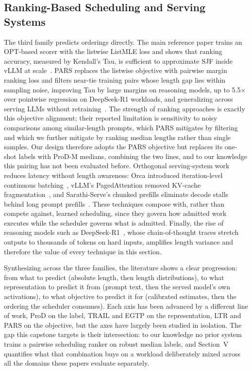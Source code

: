 \documentclass[conference]{IEEEtran}
\begin{document}
\subsection{Ranking-Based Scheduling and Serving Systems}
The third family predicts orderings directly. The main reference paper trains an OPT-based scorer with the listwise ListMLE loss and shows that ranking accuracy, measured by Kendall's Tau, is sufficient to approximate SJF inside vLLM at scale~\cite{fu2024efficient}. PARS replaces the listwise objective with pairwise margin ranking loss and filters near-tie training pairs whose length gap lies within sampling noise, improving Tau by large margins on reasoning models, up to 5.5$\times$ over pointwise regression on DeepSeek-R1 workloads, and generalizing across serving LLMs without retraining~\cite{tao2025pars}. The strength of ranking approaches is exactly this objective alignment; their reported limitation is sensitivity to noisy comparisons among similar-length prompts, which PARS mitigates by filtering and which we further mitigate by ranking median lengths rather than single samples. Our design therefore adopts the PARS objective but replaces its one-shot labels with ProD-M medians, combining the two lines, and to our knowledge this pairing has not been evaluated before. Orthogonal serving-system work reduces latency without length awareness: Orca introduced iteration-level continuous batching~\cite{yu2022orca}, vLLM's PagedAttention removed KV-cache fragmentation~\cite{kwon2023pagedattention}, and Sarathi-Serve's chunked prefills eliminate decode stalls behind long prompt prefills~\cite{agrawal2024sarathi}. These techniques compose with, rather than compete against, learned scheduling, since they govern how admitted work executes while the scheduler governs what is admitted. Finally, the rise of reasoning models such as DeepSeek-R1~\cite{guo2025deepseekr1}, whose chain-of-thought traces stretch outputs to thousands of tokens on hard inputs, amplifies length variance and therefore the value of every technique in this section.

Synthesizing across the three families, the literature shows a clear progression: from what to predict (absolute length, then length distributions), to what representation to predict it from (prompt text, then the served model's own activations), to what objective to predict it for (calibrated estimates, then the ordering the scheduler consumes). Each axis has been advanced by a different line of work, ProD on the label, TRAIL and EGTP on the representation, LTR and PARS on the objective, but the axes have largely been studied in isolation. The gap this capstone targets is their intersection: to our knowledge no prior system trains a pairwise scheduling ranker on robust median labels, and Section~V quantifies what that combination buys on a workload deliberately mixed across all the domains these papers evaluate separately.
\end{document}
